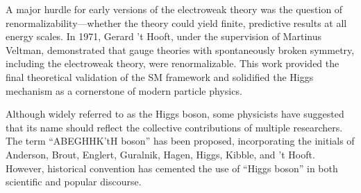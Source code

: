 A major hurdle for early versions of the electroweak theory was the question of renormalizability—whether the theory could yield finite, predictive results at all energy scales. In 1971, Gerard ’t Hooft, under the supervision of Martinus Veltman, demonstrated that gauge theories with spontaneously broken symmetry, including the electroweak theory, were renormalizable. This work provided the final theoretical validation of the SM framework and solidified the Higgs mechanism as a cornerstone of modern particle physics.

Although widely referred to as the Higgs boson, some physicists have suggested that its name should reflect the collective contributions of multiple researchers. The term ``ABEGHHK’tH boson'' has been proposed, incorporating the initials of Anderson, Brout, Englert, Guralnik, Hagen, Higgs, Kibble, and ’t Hooft. However, historical convention has cemented the use of ``Higgs boson'' in both scientific and popular discourse.








